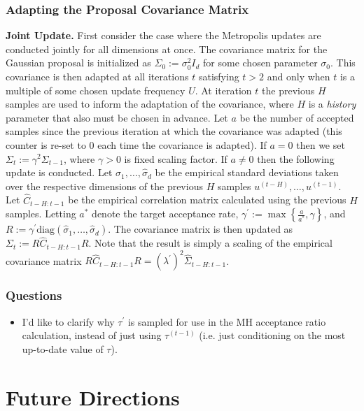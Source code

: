 \documentclass[12pt]{article}
\begin{document}
\subsubsection{Adapting the Proposal Covariance Matrix}
\textbf{Joint Update.} First consider the case where the Metropolis updates are conducted jointly for all dimensions at once. The covariance matrix for the Gaussian
proposal is initialized as $\Sigma_0 := \sigma_0^2 I_d$ for some chosen parameter $\sigma_0$. This covariance is then adapted at all iterations $t$ satisfying 
$t > 2$ and only when $t$ is a multiple of some chosen update frequency $U$. At iteration $t $ the previous $H$ samples are used to inform the adaptation of the covariance, 
where $H$ is a \textit{history} parameter that also must be chosen in advance. Let $a$ be the number of accepted samples since the previous iteration at which the 
covariance was adapted (this counter is re-set to $0$ each time the covariance is adapted). If $a = 0$ then we set $\Sigma_{t} := \gamma^2 \Sigma_{t - 1}$, where 
$\gamma > 0$ is fixed scaling factor. If $a \neq 0$ then the following update is conducted. Let $\hat{\sigma}_1, \dots, \hat{\sigma}_d$ be the empirical standard deviations
taken over the respective dimensions of the previous $H$ samples $u^{(t - H)}, \dots, u^{(t - 1)}$. Let $\hat{C}_{t - H:t-1}$ be the empirical correlation matrix calculated using
the previous $H$ samples. Letting $a^*$ denote the target acceptance rate, $\gamma^\prime := \max\left\{\frac{a}{a^*}, \gamma \right\}$, and
$R:= \gamma^\prime \text{diag}(\hat{\sigma}_1, \dots, \hat{\sigma}_d)$. The covariance matrix is then updated as $\Sigma_t := R\hat{C}_{t - H:t-1}R$. Note that the result is simply
a scaling of the empirical covariance matrix $R\hat{C}_{t - H:t-1}R = \left(\lambda^\prime\right)^2 \hat{\Sigma}_{t - H:t-1}$.




\subsubsection{Questions}
\begin{itemize}
\item I'd like to clarify why $\tau^\prime$ is sampled for use in the MH acceptance ratio calculation, instead of just using $\tau^{(t - 1)}$ (i.e. just conditioning on the most up-to-date value of $\tau$). 
\end{itemize}


\section{Future Directions}
\end{document}
